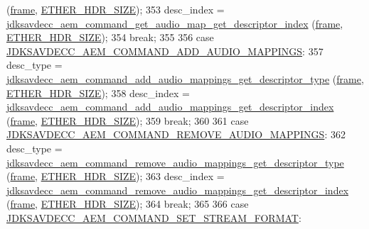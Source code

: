 \begin{DoxyCode}
      (\hyperlink{gst__avb__playbin_8c_ac8e710e0b5e994c0545d75d69868c6f0}{frame}, \hyperlink{namespaceavdecc__lib_a6c827b1a0d973e18119c5e3da518e65ca9512ad9b34302ba7048d88197e0a2dc0}{ETHER\_HDR\_SIZE});
353         desc\_index = \hyperlink{group__command__get__audio__map_ga06ae150bd8b86ff7a6a1631109268b74}{jdksavdecc\_aem\_command\_get\_audio\_map\_get\_descriptor\_index}
      (\hyperlink{gst__avb__playbin_8c_ac8e710e0b5e994c0545d75d69868c6f0}{frame}, \hyperlink{namespaceavdecc__lib_a6c827b1a0d973e18119c5e3da518e65ca9512ad9b34302ba7048d88197e0a2dc0}{ETHER\_HDR\_SIZE});
354         \textcolor{keywordflow}{break};
355 
356     \textcolor{keywordflow}{case} \hyperlink{group__command_gac872db287b8e91225b52129c617e1da0}{JDKSAVDECC\_AEM\_COMMAND\_ADD\_AUDIO\_MAPPINGS}:
357         desc\_type = 
      \hyperlink{group__command__add__audio__mappings_gac0f768e0c023e0eeff445a968143ab93}{jdksavdecc\_aem\_command\_add\_audio\_mappings\_get\_descriptor\_type}
      (\hyperlink{gst__avb__playbin_8c_ac8e710e0b5e994c0545d75d69868c6f0}{frame}, \hyperlink{namespaceavdecc__lib_a6c827b1a0d973e18119c5e3da518e65ca9512ad9b34302ba7048d88197e0a2dc0}{ETHER\_HDR\_SIZE});
358         desc\_index = 
      \hyperlink{group__command__add__audio__mappings_gad1fbba911b4812ed813ce343d509dba6}{jdksavdecc\_aem\_command\_add\_audio\_mappings\_get\_descriptor\_index}
      (\hyperlink{gst__avb__playbin_8c_ac8e710e0b5e994c0545d75d69868c6f0}{frame}, \hyperlink{namespaceavdecc__lib_a6c827b1a0d973e18119c5e3da518e65ca9512ad9b34302ba7048d88197e0a2dc0}{ETHER\_HDR\_SIZE});
359         \textcolor{keywordflow}{break};
360 
361     \textcolor{keywordflow}{case} \hyperlink{group__command_gae6ee643ac7127012a5a4cc44813f52c7}{JDKSAVDECC\_AEM\_COMMAND\_REMOVE\_AUDIO\_MAPPINGS}:
362         desc\_type = 
      \hyperlink{group__command__remove__audio__mappings_gac08f0d9d6c76db5a63f24480cbb3c443}{jdksavdecc\_aem\_command\_remove\_audio\_mappings\_get\_descriptor\_type}
      (\hyperlink{gst__avb__playbin_8c_ac8e710e0b5e994c0545d75d69868c6f0}{frame}, \hyperlink{namespaceavdecc__lib_a6c827b1a0d973e18119c5e3da518e65ca9512ad9b34302ba7048d88197e0a2dc0}{ETHER\_HDR\_SIZE});
363         desc\_index = 
      \hyperlink{group__command__remove__audio__mappings_gabc08631a8d965cf87079bd7144b45c38}{jdksavdecc\_aem\_command\_remove\_audio\_mappings\_get\_descriptor\_index}
      (\hyperlink{gst__avb__playbin_8c_ac8e710e0b5e994c0545d75d69868c6f0}{frame}, \hyperlink{namespaceavdecc__lib_a6c827b1a0d973e18119c5e3da518e65ca9512ad9b34302ba7048d88197e0a2dc0}{ETHER\_HDR\_SIZE});
364         \textcolor{keywordflow}{break};
365 
366     \textcolor{keywordflow}{case} \hyperlink{group__command_ga5a4c1db8bb66e83da7bcdff6a4e2c7e7}{JDKSAVDECC\_AEM\_COMMAND\_SET\_STREAM\_FORMAT}:

\end{DoxyCode}
